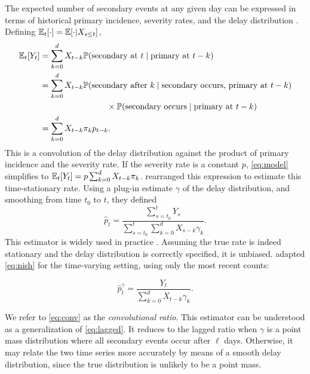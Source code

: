 \documentclass{article}
\renewcommand{\hat}{\widehat} %
\newcommand{\given}{\; \vert \;}
\newcommand{\djmcomment}[1]{{\color{teal}[DJM: #1]}}
\newcommand{\jmgcomment}[1]{{\color{cyan}[JMG: #1]}}
\begin{document}
The expected number of secondary events at any given day can be expressed in
terms of historical primary incidence, severity rates, and the delay
distribution \citep{fusedlasso,nishiura}. Defining $\mathbb{E}_t[\cdot] = \mathbb{E}[\cdot\vert X_{s\leq t}]$,
%
\begin{align}\label{eq:model}
    \E_t[Y_t] &= \sum_{k=0}^d X_{t-k} \mathbb{P}(\text{secondary at $t$}\given\text{primary at }t-k) \nonumber \\ %
            &= \sum_{k=0}^d X_{t-k} \mathbb{P}(\text{secondary after $k$}\given\text{secondary occurs, primary at }t-k) \nonumber \\
    &\qquad\qquad\qquad\qquad\times\mathbb{P}(\text{secondary occurs}\given\text{primary at $t-k$}) \nonumber \\
    &= \sum_{k=0}^d X_{t-k} \pi_k p_{t-k}.%
\end{align}
%
This is a convolution of the delay distribution against the product of
primary incidence and the severity rate. If the severity rate is a constant
$p$, \eqref{eq:model} simplifies to $\mathbb{E}_t[Y_t] = p\sum_{k=0}^d X_{t-k}\pi_k$.
\citet{nishiura} rearranged this expression to estimate this time-stationary rate.
Using a plug-in estimate $\gamma$ of the delay distribution, and smoothing from time $t_0$ to $t$, they defined
%
\begin{equation}\label{eq:nish}
    \hat{p}_t = \frac{\sum_{s=t_0}^t Y_s}{\sum_{s=t_0}^t \sum_{k=0}^d X_{s-k}\gamma_k}.
\end{equation}
This estimator is widely used in practice \citep{nishiuraEx1, nishiuraEx2, Russell2020}. Assuming the true rate is indeed stationary and the delay distribution is correctly specified, it is unbiased. \citet{UKpaper} adapted \eqref{eq:nish} for the time-varying setting, using only the most recent counts:

\begin{equation}\label{eq:conv}
    \hat{p}_t^{\gamma} = \frac{Y_t}{\sum_{k=0}^d X_{t-k}\gamma_k}.%
\end{equation}

We refer to \ref{eq:conv} as the \textit{convolutional ratio}. 
This estimator can be understood as a generalization of \eqref{eq:lagged}. 
It reduces to the lagged ratio when ${\gamma}$ is a point mass distribution 
where all secondary events occur after $\ell$ days. 
Otherwise, it may relate the two time series more accurately by means of a smooth delay distribution, since the true distribution is unlikely to be a point mass. 
\end{document}

